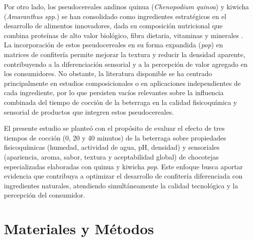 \documentclass[manuscript,screen,review]{acmart}
\begin{document}
    Por otro lado, los pseudocereales andinos quinua (\textit{Chenopodium quinoa}) y kiwicha (\textit{Amaranthus spp.}) se han consolidado como ingredientes estratégicos en el desarrollo de alimentos innovadores, dada su composición nutricional que combina proteínas de alto valor biológico, fibra dietaria, vitaminas y minerales \cite{RepoCarrascoValencia2009,Singh2023}. La incorporación de estos pseudocereales en su forma expandida (\textit{pop}) en matrices de confitería permite mejorar la textura y reducir la densidad aparente, contribuyendo a la diferenciación sensorial y a la percepción de valor agregado en los consumidores. No obstante, la literatura disponible se ha centrado principalmente en estudios composicionales o en aplicaciones independientes de cada ingrediente, por lo que persisten vacíos relevantes sobre la influencia combinada del tiempo de cocción de la beterraga en la calidad fisicoquímica y sensorial de productos que integren estos pseudocereales.
    
    El presente estudio se planteó con el propósito de evaluar el efecto de tres tiempos de cocción (0, 20 y 40 minutos) de la beterraga sobre propiedades fisicoquímicas (humedad, actividad de agua, pH, densidad) y sensoriales (apariencia, aroma, sabor, textura y aceptabilidad global) de chocotejas especializadas elaboradas con quinua y kiwicha \textit{pop}. Este enfoque busca aportar evidencia que contribuya a optimizar el desarrollo de confitería diferenciada con ingredientes naturales, atendiendo simultáneamente la calidad tecnológica y la percepción del consumidor.
\section{Materiales y Métodos}
\end{document}
